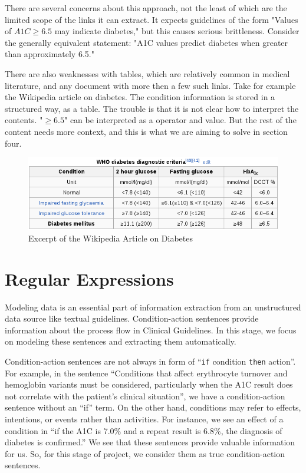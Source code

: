 \documentclass[12pt,letterpaper]{article}
\begin{document}
There are several concerns about this approach, not the least of which are the limited scope of the links it can extract. It expects guidelines of the form
"Values of $A1C \geq 6.5$ may indicate diabetes," but this causes serious brittleness. Consider the generally equivalent statement: "A1C values predict diabetes when greater than approximately 6.5."

There are also weaknesses with tables, which are relatively common in medical literature, and any document with more then a few such links. Take for example the Wikipedia article on diabetes. The condition information is stored in a structured way, as a table. The trouble is that it is not clear how to interpret the contents. "$\geq 6.5$" can be interpreted as a operator and value. But the rest of the content needs more context, and this is what we are aiming to solve in section four.
\begin{figure}
\includegraphics[width=\textwidth]{WikipediaA1CTable}
\caption{Excerpt of the Wikipedia Article on Diabetes}
\end{figure}
\section{Regular Expressions}
Modeling data is an essential part of information extraction from an unstructured data source like textual guidelines. Condition-action sentences provide information about the process flow in Clinical Guidelines. In this stage, we focus on modeling these sentences and extracting them automatically.

Condition-action sentences are not always in form of ``\texttt{if} condition \texttt{then} action''. For example, in the sentence ``Conditions that affect erythrocyte turnover and hemoglobin variants must be considered, particularly when the A1C result does not correlate with the patient's clinical situation'', we have a condition-action sentence without an ``if'' term. On the other hand, conditions may refer to effects, intentions, or events rather than activities. For instance, we see an effect of a condition in ``if the A1C is 7.0\% and a repeat result is 6.8\%, the diagnosis of diabetes is confirmed.'' We see that these sentences provide valuable information for us. So, for this stage of project, we consider them as true condition-action sentences. 
\end{document}
